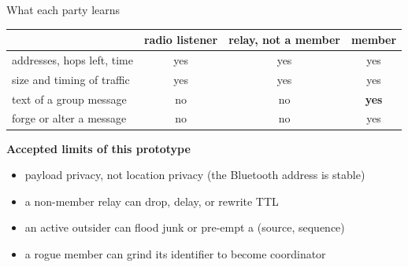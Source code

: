 \documentclass[aspectratio=169,11pt]{beamer}
\begin{document}
\begin{frame}{What each party learns}
{\small
\begin{tabular}{@{}lccc@{}}
\toprule
 & radio listener & relay, not a member & member \\
\midrule
addresses, hops left, time & yes & yes & yes \\
size and timing of traffic & yes & yes & yes \\
text of a group message & no & no & \textbf{yes} \\
forge or alter a message & no & no & yes \\
\bottomrule
\end{tabular}}
\vspace{6mm}
\textbf{Accepted limits of this prototype}
\begin{itemize}
  \item payload privacy, not location privacy (the Bluetooth address is stable)
  \item a non-member relay can drop, delay, or rewrite TTL
  \item an active outsider can flood junk or pre-empt a (source, sequence)
  \item a rogue member can grind its identifier to become coordinator
\end{itemize}
\end{frame}
\end{document}
